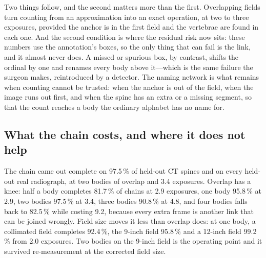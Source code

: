 \documentclass[11pt,letterpaper]{article}
\begin{document}
Two things follow, and the second matters more than the first. Overlapping fields turn counting from an
approximation into an exact operation, at two to three exposures, provided the anchor is in the first
field and the vertebrae are found in each one. And the second condition is where the residual risk now
sits: these numbers use the annotation's boxes, so the only thing that can fail is the link, and it
almost never does. A missed or spurious box, by contrast, shifts the ordinal by one and renames every
body above it---which is the same failure the surgeon makes, reintroduced by a detector. The naming
network is what remains when counting cannot be trusted: when the anchor is out of the field, when the
image runs out first, and when the spine has an extra or a missing segment, so that the count reaches a
body the ordinary alphabet has no name for.

\subsection*{What the chain costs, and where it does not help}
The chain came out complete on 97.5\,\% of held-out CT spines and on every held-out real radiograph, at two
bodies of overlap and 3.4 exposures. Overlap has a knee: half a body completes 81.7\,\% of chains at 2.9
exposures, one body 95.8\,\% at 2.9, two bodies 97.5\,\% at 3.4, three bodies 90.8\,\% at 4.8, and four
bodies falls back to 82.5\,\% while costing 9.2, because every extra frame is another link that can be
joined wrongly. Field size moves it less than overlap does: at one body, a collimated field completes
92.4\,\%, the 9-inch field 95.8\,\% and a 12-inch field 99.2\,\% from 2.0 exposures. Two bodies on the 9-inch
field is the operating point and it survived re-measurement at the corrected field size.
\end{document}
